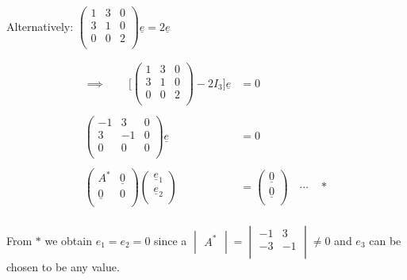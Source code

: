 \documentclass[11pt,a4paper]{article}
\theoremstyle{definition}
\begin{document}
\begin{enumerate}
\begin{enumerate}
Alternatively: $\begin{pmatrix}
1 & 3 & 0\\
3 & 1 & 0\\
0 & 0 & 2\\
\end{pmatrix}\underline{e} = 2\underline{e}$

\begin{align*}
\implies \qquad  \Bigg[\begin{pmatrix}
1 & 3 & 0\\
3 & 1 & 0\\
0 & 0 & 2\\
\end{pmatrix} -2 I_3\Bigg] \underline{e} & = 0\\\\
\begin{pmatrix}
-1 & 3 & 0\\
3 & -1 & 0\\
0 & 0 & 0\\
\end{pmatrix}\underline{e} & = 0\\\\
\begin{pmatrix}
A^* & \underline{0}\\
\underline{0} & 0\\
\end{pmatrix}\begin{pmatrix}
\underline{e}_1\\
\underline{e}_2\\
\end{pmatrix} & = \begin{pmatrix}
\underline{0}\\
\underline{0}\\
\end{pmatrix}\quad  \cdots\quad  *\\
\end{align*}

From $*$ we obtain $e_1 = e_2 =0$ since a $
\begin{vmatrix}
A^*\\
\end{vmatrix}= \begin{vmatrix}
-1 & 3\\
-3 & -1\\
\end{vmatrix}\neq 0$ and $e_3$ can be chosen to be any value.\\\\





\end{enumerate}
\end{enumerate}
\end{document}
